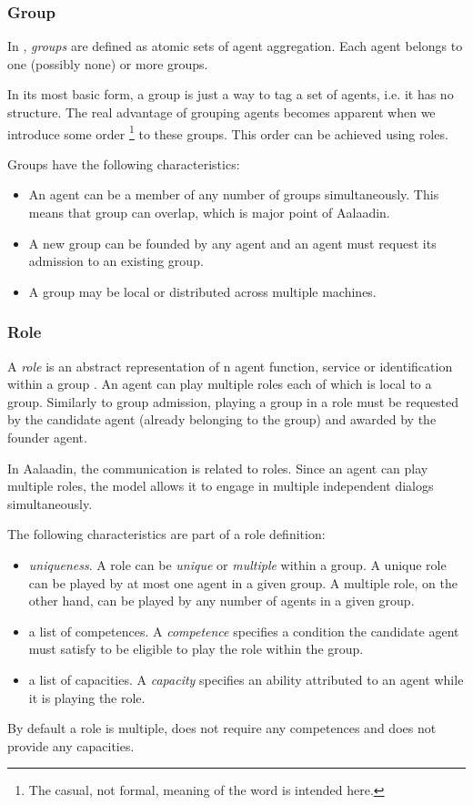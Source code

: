 \subsubsection*{Group}

In \cite{Ferber97}, \textit{groups} are defined as atomic sets of agent aggregation.
Each agent belongs to one (possibly none) or more groups.

In its most basic form, a group is just a way to tag a set of agents, i.e. it has no structure.
The real advantage of grouping agents becomes apparent when we introduce some order \footnote{The casual, not formal, meaning of the word is intended here.} to these groups.
This order can be achieved using roles.

Groups have the following characteristics:
\begin{itemize}
	\item An agent can be a member of any number of groups simultaneously.
	This means that group can overlap, which is major point of Aalaadin.
	\item A new group can be founded by any agent and an agent must request its admission to an existing group.
	\item A group may be local or distributed across multiple machines.
\end{itemize}

\subsubsection*{Role}

A \textit{role} is an abstract representation of n agent function, service or identification within a group \cite{Ferber97}.
An agent can play multiple roles each of which is local to a group.
Similarly to group admission, playing a group in a role must be requested by the candidate agent (already belonging to the group) and awarded by the founder agent.

In Aalaadin, the communication is related to roles. Since an agent can play multiple roles, the model allows it to engage in multiple independent dialogs simultaneously.

The following characteristics are part of a role definition:
\begin{itemize}
	\item \textit{uniqueness}. A role can be \textit{unique} or \textit{multiple} within a group.
	A unique role can be played by at most one agent in a given group.
	A multiple role, on the other hand, can be played by any number of agents in a given group. 
	\item a list of competences. A \textit{competence} specifies a condition the candidate agent must satisfy to be eligible to play the role within the group. 
	\item a list of capacities. A \textit{capacity} specifies an ability attributed to an agent while it is playing the role.
\end{itemize}
By default a role is multiple, does not require any competences and does not provide any capacities.

